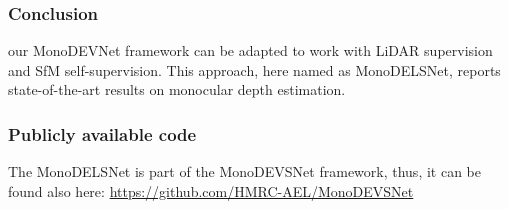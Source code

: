 \documentclass[journal]{IEEEtran}
\begin{document}
\subsubsection{Conclusion} our MonoDEVNet framework can be adapted to work with LiDAR supervision and SfM self-supervision. This approach, here named as MonoDELSNet, reports state-of-the-art results on monocular depth estimation. 

\subsubsection{Publicly available code}
The MonoDELSNet is part of the MonoDEVSNet framework, thus, it can be found also here: \url{https://github.com/HMRC-AEL/MonoDEVSNet}





\ifCLASSOPTIONcaptionsoff
  \newpage
\fi










\end{document}
